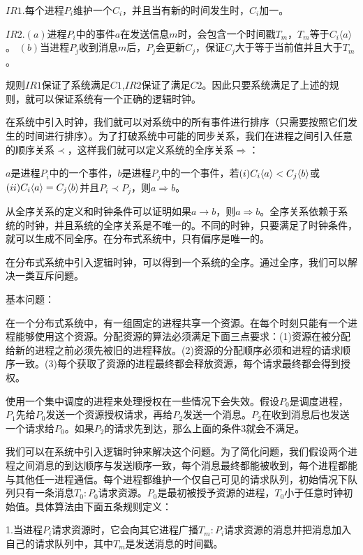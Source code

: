 \documentclass[UTF8]{article}
\begin{document}
	$IR1$.每个进程$P_i$维护一个$C_i$，并且当有新的时间发生时，$C_i$加一。

	$IR2$.$(a)$进程$P_i$中的事件$a$在发送信息$m$时，会包含一个时间戳$T_m$，$T_m$等于$C_i \langle a \rangle$。
		 $(b)$当进程$P_j$收到消息$m$后，$P_j$会更新$C_j$，保证$C_j$大于等于当前值并且大于$T_m$。

	规则$IR1$保证了系统满足$C1$,$IR2$保证了满足$C2$。因此只要系统满足了上述的规则，就可以保证系统有一个正确的逻辑时钟。

	在系统中引入时钟，我们就可以对系统中的所有事件进行排序（只需要按照它们发生的时间进行排序）。为了打破系统中可能的同步关系，我们在进程之间引入任意的顺序关系$\prec$，这样我们就可以定义系统的全序关系$\Rightarrow$：
	
	$a$是进程$P_i$中的一个事件，$b$是进程$P_j$中的一个事件，若$(\romannumeral1)C_i\langle a \rangle < C_j \langle b \rangle$或$(\romannumeral2) C_i\langle a \rangle = C_j \langle b \rangle$并且$P_i \prec P_j$，则$a \Rightarrow b$。

	从全序关系的定义和时钟条件可以证明如果$a \rightarrow b$，则$a \Rightarrow b$。全序关系依赖于系统的时钟，并且系统的全序关系是不唯一的。不同的时钟，只要满足了时钟条件，就可以生成不同全序。在分布式系统中，只有偏序是唯一的。

	在分布式系统中引入逻辑时钟，可以得到一个系统的全序。通过全序，我们可以解决一类互斥问题。

	基本问题：

	在一个分布式系统中，有一组固定的进程共享一个资源。在每个时刻只能有一个进程能够使用这个资源。分配资源的算法必须满足下面三点要求：(1)资源在被分配给新的进程之前必须先被旧的进程释放。(2)资源的分配顺序必须和进程的请求顺序一致。(3)每个获取了资源的进程最终都会释放资源，每个请求最终都会得到授权。
	
	使用一个集中调度的进程来处理授权在一些情况下会失效。假设$P_0$是调度进程，$P_1$先给$P_0$发送一个资源授权请求，再给$P_2$发送一个消息。$P_2$在收到消息后也发送一个请求给$P_0$。如果$P_2$的请求先到达，那么上面的条件3就会不满足。
	
	我们可以在系统中引入逻辑时钟来解决这个问题。为了简化问题，我们假设两个进程之间消息的到达顺序与发送顺序一致，每个消息最终都能被收到，每个进程都能与其他任一进程通信。每个进程都维护一个仅自己可见的请求队列，初始情况下队列只有一条消息$T_0:P_0$请求资源。$P_0$是最初被授予资源的进程，$T_0$小于任意时钟初始值。具体算法由下面五条规则定义：

	1.当进程$P_i$请求资源时，它会向其它进程广播$T_m:P_i$请求资源的消息并把消息加入自己的请求队列中，其中$T_m$是发送消息的时间戳。
\end{document}
